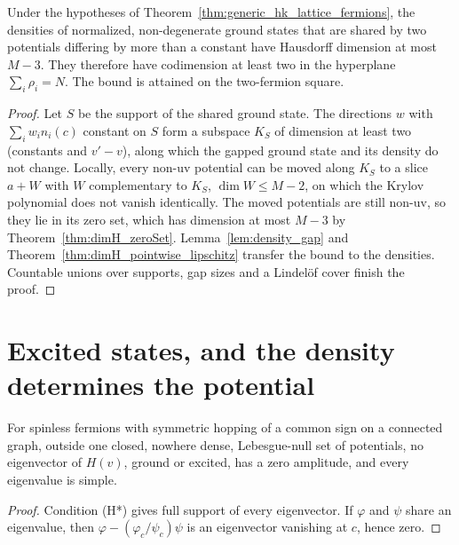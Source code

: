 \begin{theorem}
  \label{thm:dimH_nonUVDens}
  \leanok
  Under the hypotheses of Theorem~\ref{thm:generic_hk_lattice_fermions}, the densities of normalized,
  non-degenerate ground states that are shared by two potentials differing by more than a constant have
  Hausdorff dimension at most $M-3$. They therefore have codimension at least two in the hyperplane
  $\sum_i\rho_i=N$. The bound is attained on the two-fermion square.
\end{theorem}
\begin{proof}
  \leanok
  Let $S$ be the support of the shared ground state. The directions $w$ with $\sum_iw_in_i(c)$ constant on
  $S$ form a subspace $K_S$ of dimension at least two (constants and $v'-v$), along which the gapped ground
  state and its density do not change. Locally, every non-uv potential can be moved along $K_S$ to a slice
  $a+W$ with $W$ complementary to $K_S$, $\dim W\le M-2$, on which the Krylov polynomial does not vanish
  identically. The moved potentials are still non-uv, so they lie in its zero set, which has dimension at
  most $M-3$ by Theorem~\ref{thm:dimH_zeroSet}. Lemma~\ref{lem:density_gap} and
  Theorem~\ref{thm:dimH_pointwise_lipschitz} transfer the bound to the densities. Countable unions over
  supports, gap sizes and a Lindel\"of cover finish the proof.
\end{proof}

\section{Excited states, and the density determines the potential}

\begin{theorem}
  \label{thm:excited_no_zero_and_simple}
  \leanok
  For spinless fermions with symmetric hopping of a common sign on a connected graph, outside one closed, nowhere dense,
  Lebesgue-null set of potentials, no eigenvector of $H(v)$, ground or excited, has a zero amplitude, and every
  eigenvalue is simple.
\end{theorem}
\begin{proof}
  \leanok
  Condition (H*) gives full support of every eigenvector. If $\varphi$ and $\psi$ share an eigenvalue, then
  $\varphi-(\varphi_c/\psi_c)\psi$ is an eigenvector vanishing at $c$, hence zero.
\end{proof}

